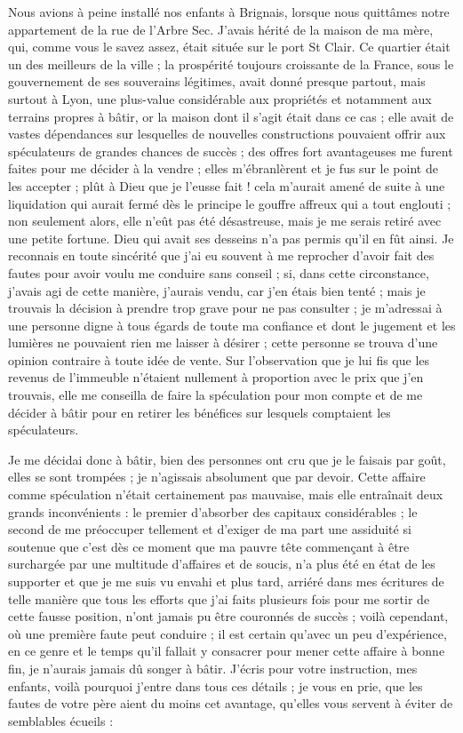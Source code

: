 \documentclass[11pt,a4paper]{report}
\begin{document}
Nous avions à peine installé nos enfants à Brignais, lorsque nous quittâmes notre appartement de la rue de l'Arbre Sec. J'avais hérité de la maison de ma mère, qui, comme vous le savez assez, était située sur le port St Clair. Ce quartier était un des meilleurs de la ville ; la prospérité toujours croissante de la France, sous le gouvernement de ses souverains légitimes, avait donné presque partout, mais surtout à Lyon, une plus-value considérable aux propriétés et notamment aux terrains propres à bâtir, or la maison dont il s'agit était dans ce cas ; elle avait de vastes dépendances sur lesquelles de nouvelles constructions pouvaient offrir aux spéculateurs de grandes chances de succès ; des offres fort avantageuses me furent faites pour me décider à la vendre ; elles m'ébranlèrent et je fus sur le point de les accepter ; plût à Dieu que je l'eusse fait ! cela m'aurait amené de suite à une liquidation qui aurait fermé dès le principe le gouffre affreux qui a tout englouti ; non seulement alors, elle n'eût pas été désastreuse, mais je me serais retiré avec une petite fortune. Dieu qui avait ses desseins n'a pas permis qu'il en fût ainsi. Je reconnais en toute sincérité que j'ai eu souvent à me reprocher d'avoir fait des fautes pour avoir voulu me conduire sans conseil ; si, dans cette circonstance, j'avais agi de cette manière, j'aurais vendu, car j'en étais bien tenté ; mais je trouvais la décision à prendre trop grave pour ne pas consulter ; je m'adressai à une personne digne à tous égards de toute ma confiance et dont le jugement et les lumières ne pouvaient rien me laisser à désirer ; cette personne se trouva d'une opinion contraire à toute idée de vente. Sur l'observation que je lui fis que les revenus de l'immeuble n'étaient nullement à proportion avec le prix que j'en trouvais, elle me conseilla de faire la spéculation pour mon compte et de me décider à bâtir pour en retirer les bénéfices sur lesquels comptaient les spéculateurs.

Je me décidai donc à bâtir, bien des personnes ont cru que je le faisais par goût, elles se sont trompées ; je n'agissais absolument que par devoir. Cette affaire comme spéculation n'était certainement pas mauvaise, mais elle entraînait deux grands inconvénients : le premier d'absorber des capitaux considérables ; le second de me préoccuper tellement et d'exiger de ma part une assiduité si soutenue que c'est dès ce moment que ma pauvre tête commençant à être surchargée par une multitude d'affaires et de soucis, n'a plus été en état de les supporter et que je me suis vu envahi et plus tard, arriéré dans mes écritures de telle manière que tous les efforts que j'ai faits plusieurs fois pour me sortir de cette fausse position, n'ont jamais pu être couronnés de succès ; voilà cependant, où une première faute peut conduire ; il est certain qu'avec un peu d'expérience, en ce genre et le temps qu'il fallait y consacrer pour mener cette affaire à bonne fin, je n'aurais jamais dû songer à bâtir. J'écris pour votre instruction, mes enfants, voilà pourquoi j'entre dans tous ces détails ; je vous en prie, que les fautes de votre père aient du moins cet avantage, qu'elles vous servent à éviter de semblables écueils :
\end{document}
